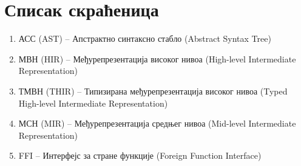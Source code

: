 \section{Списак скраћеница}

\begin{enumerate}
    \item АСС (AST) – Апстрактно синтаксно стабло (Abstract Syntax Tree)
    \item МВН (HIR) – Међурепрезентација високог нивоа (High-level Intermediate Representation)
    \item ТМВН (THIR) – Типизирана међурепрезентација високог нивоа (Typed High-level Intermediate Representation)
    \item МСН (MIR) – Међурепрезентација средњег нивоа (Mid-level Intermediate Representation)
    \item FFI – Интерфејс за стране функције (Foreign Function Interface)
\end{enumerate}